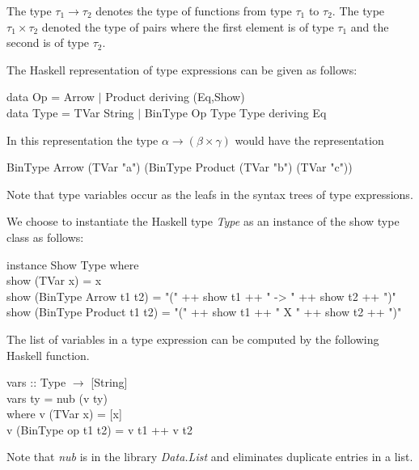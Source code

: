\documentclass[11pt]{article}
\begin{document}
The type $\tau_1\rightarrow\tau_2$ denotes the type of functions from type
$\tau_1$ to $\tau_2$.  The type $\tau_1\times\tau_2$ denoted the type of pairs
where the first element is of type $\tau_1$ and the second is of type $\tau_2$.

The Haskell representation of type expressions can be given as follows:
\begin{smallprogram*}
\> data Op = Arrow $\mid$ Product     deriving (Eq,Show) \\
\> data  Type =   TVar  String $\mid$  BinType Op  Type Type     deriving Eq \\
\end{smallprogram*}

In this representation the type $\alpha\rightarrow(\beta\times\gamma)$ would
have the representation
\begin{smallprogram*}
\>  BinType Arrow (TVar "a") (BinType Product (TVar "b") (TVar "c"))
\end{smallprogram*}

Note that type variables occur as the leafs in the syntax trees of type
expressions.


We choose to instantiate the Haskell type {\it{Type}} as an instance of the
show type class as follows:

\begin{smallprogram*}
\> instance Show Type where \\
\>    show (TVar x) = x \\
\>    show (BinType Arrow t1 t2) = "(" ++ show t1 ++ " -> " ++ show t2 ++ ")" \\
\>    show (BinType Product t1 t2) = "(" ++ show t1 ++ " X " ++ show t2 ++ ")" \\
\end{smallprogram*}


The list of variables in a type expression can be computed by the following
Haskell function.

\begin{smallprogram*}
\> vars :: Type $\rightarrow$ [String] \\
\> vars ty = nub (v ty)  \\
\>     where v (TVar x) = [x] \\
\>           v (BinType op t1 t2) = v t1 ++ v t2 \\
\end{smallprogram*}

Note that {\it{nub}} is in the library {\em{Data.List}} and eliminates
duplicate entries in a list.
\end{document}
